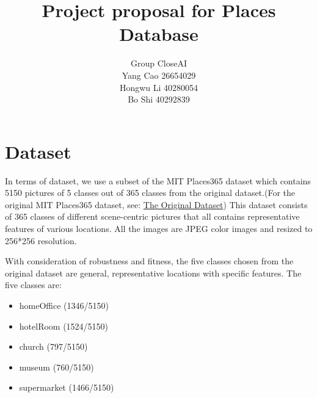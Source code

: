 \documentclass[10pt,twocolumn,letterpaper]{article}
\begin{document}
\date{}
\title{Project proposal for Places Database}

\author{Group CloseAI\\
Yang Cao 26654029\\
Hongwu Li 40280054\\
Bo Shi 40292839
}
\maketitle





\section{Dataset}
\hspace{0.5cm} In terms of dataset, we use a subset of the MIT Places365 dataset\cite{zhou2017places} which contains 5150 pictures of 5 classes out of 365 classes from the original dataset.(For the original MIT Places365 dataset, see: \href{http://places2.csail.mit.edu/download-private.html} {The Original Dataset}) This dataset consists of 365 classes of different scene-centric pictures that all contains representative features of various locations. All the images are JPEG color images and resized to 256*256 resolution.

\hspace{0.1cm} With consideration of robustness and fitness, the five classes chosen from the original dataset are general, representative locations with specific features. The five classes are:
\begin{itemize}[noitemsep]
    \item homeOffice (1346/5150)
    \item hotelRoom (1524/5150)
    \item church (797/5150)
    \item museum (760/5150)
    \item supermarket (1466/5150)
\end{itemize}
\hspace{0.5cm} 
\end{document}
